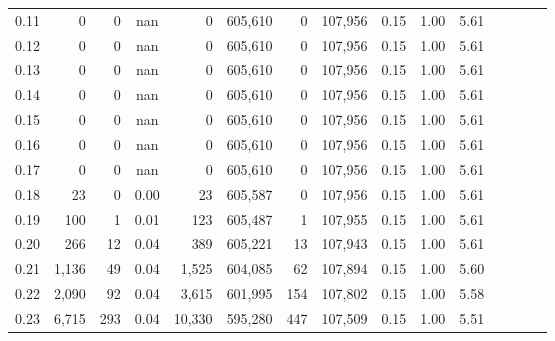 \begin{tabular}{rrrcrrrrrrrrrrr}
0.11 &       0 &      0 &                                        nan &        0 &  605,610 &        0 &  107,956 &  0.15 &  1.00 &                         5.61 \\
0.12 &       0 &      0 &                                        nan &        0 &  605,610 &        0 &  107,956 &  0.15 &  1.00 &                         5.61 \\
0.13 &       0 &      0 &                                        nan &        0 &  605,610 &        0 &  107,956 &  0.15 &  1.00 &                         5.61 \\
0.14 &       0 &      0 &                                        nan &        0 &  605,610 &        0 &  107,956 &  0.15 &  1.00 &                         5.61 \\
0.15 &       0 &      0 &                                        nan &        0 &  605,610 &        0 &  107,956 &  0.15 &  1.00 &                         5.61 \\
0.16 &       0 &      0 &                                        nan &        0 &  605,610 &        0 &  107,956 &  0.15 &  1.00 &                         5.61 \\
0.17 &       0 &      0 &                                        nan &        0 &  605,610 &        0 &  107,956 &  0.15 &  1.00 &                         5.61 \\
0.18 &      23 &      0 &                                       0.00 &       23 &  605,587 &        0 &  107,956 &  0.15 &  1.00 &                         5.61 \\
0.19 &     100 &      1 &                                       0.01 &      123 &  605,487 &        1 &  107,955 &  0.15 &  1.00 &                         5.61 \\
0.20 &     266 &     12 &                                       0.04 &      389 &  605,221 &       13 &  107,943 &  0.15 &  1.00 &                         5.61 \\
0.21 &   1,136 &     49 &                                       0.04 &    1,525 &  604,085 &       62 &  107,894 &  0.15 &  1.00 &                         5.60 \\
0.22 &   2,090 &     92 &                                       0.04 &    3,615 &  601,995 &      154 &  107,802 &  0.15 &  1.00 &                         5.58 \\
0.23 &   6,715 &    293 &                                       0.04 &   10,330 &  595,280 &      447 &  107,509 &  0.15 &  1.00 &                         5.51 \\

\end{tabular}
